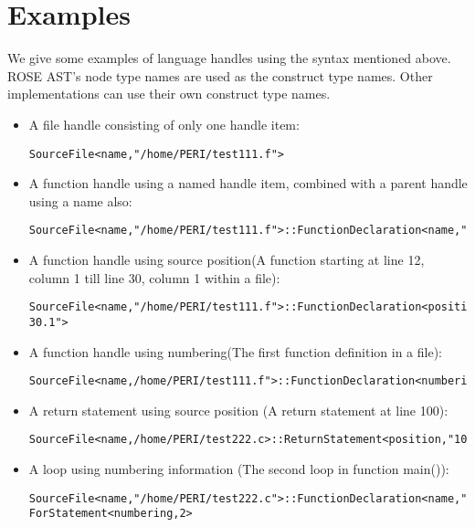 \section{Examples}
We give some examples of language handles using the syntax mentioned above. 
ROSE AST's node type names are used as the construct type names. 
Other implementations can use their own construct type names.

\begin{itemize}
\item A file handle consisting of only one handle item: 
\begin{verbatim}
SourceFile<name,"/home/PERI/test111.f">
\end{verbatim}

\item A function handle using a named handle item, combined with a parent handle using a name also: 

\begin{verbatim}
SourceFile<name,"/home/PERI/test111.f">::FunctionDeclaration<name,"foo">
\end{verbatim}

\item A function handle using source position(A function starting at line 12, column 1 till line 30, column 1 within a file): 

\begin{verbatim}
SourceFile<name,"/home/PERI/test111.f">::FunctionDeclaration<position,"12.1-30.1">

\end{verbatim}
\item A function handle using numbering(The first function definition in a file): 
\begin{verbatim}
SourceFile<name,/home/PERI/test111.f">::FunctionDeclaration<numbering,1>
\end{verbatim}
\item A return statement using source position (A return statement at line 100):
\begin{verbatim}
SourceFile<name,/home/PERI/test222.c>::ReturnStatement<position,"100">

\end{verbatim}
\item A loop using numbering information (The second loop in function
main()): 
\begin{verbatim}
SourceFile<name,"/home/PERI/test222.c">::FunctionDeclaration<name,"main">::
ForStatement<numbering,2>
\end{verbatim}
\end{itemize}

